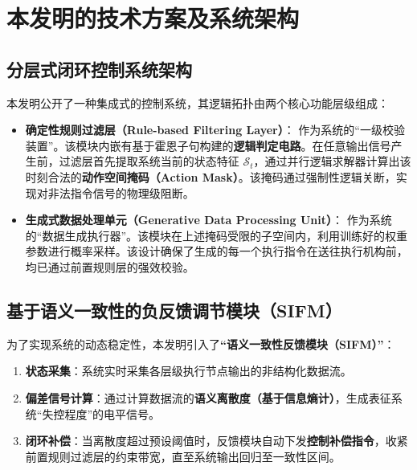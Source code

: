 \documentclass[UTF8, fontset=mac]{ctexart}
\begin{document}
\section{本发明的技术方案及系统架构}

\subsection{分层式闭环控制系统架构}
本发明公开了一种集成式的控制系统，其逻辑拓扑由两个核心功能层级组成：

\begin{itemize}
    \item \textbf{确定性规则过滤层（Rule-based Filtering Layer）}：
    作为系统的“一级校验装置”。该模块内嵌有基于霍恩子句构建的\textbf{逻辑判定电路}。在任意输出信号产生前，过滤层首先提取系统当前的状态特征 $\mathcal{S}_t$，通过并行逻辑求解器计算出该时刻合法的\textbf{动作空间掩码（Action Mask）}。该掩码通过强制性逻辑关断，实现对非法指令信号的物理级阻断。
    
    \item \textbf{生成式数据处理单元（Generative Data Processing Unit）}：
    作为系统的“数据生成执行器”。该模块在上述掩码受限的子空间内，利用训练好的权重参数进行概率采样。该设计确保了生成的每一个执行指令在送往执行机构前，均已通过前置规则层的强效校验。
\end{itemize}

\subsection{基于语义一致性的负反馈调节模块（SIFM）}
为了实现系统的动态稳定性，本发明引入了\textbf{“语义一致性反馈模块（SIFM）”}：
\begin{enumerate}
    \item \textbf{状态采集}：系统实时采集各层级执行节点输出的非结构化数据流。
    \item \textbf{偏差信号计算}：通过计算数据流的\textbf{语义离散度（基于信息熵计）}，生成表征系统“失控程度”的电平信号。
    \item \textbf{闭环补偿}：当离散度超过预设阈值时，反馈模块自动下发\textbf{控制补偿指令}，收紧前置规则过滤层的约束带宽，直至系统输出回归至一致性区间。
\end{enumerate}
\end{document}
